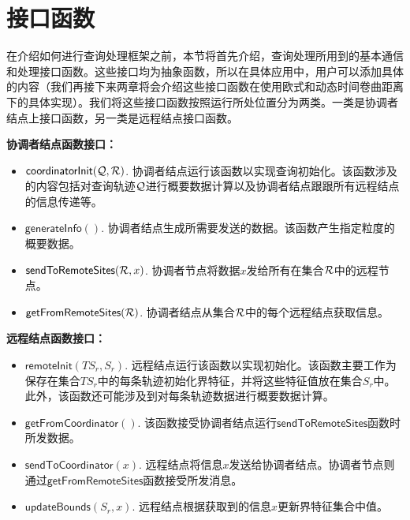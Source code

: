 \section{接口函数}\label{sec-c3-interface}
在介绍如何进行查询处理框架之前，本节将首先介绍，查询处理所用到的基本通信和处理接口函数。这些接口均为抽象函数，所以在具体应用中，用户可以添加具体的内容（我们再接下来两章将会介绍这些接口函数在使用欧式和动态时间卷曲距离下的具体实现）。我们将这些接口函数按照运行所处位置分为两类。一类是协调者结点上接口函数，另一类是远程结点接口函数。

\textbf{协调者结点函数接口：}
\begin{itemize}
	\item  $\textsf{coordinatorInit}({\cal Q}, {\cal R})$.
	协调者结点运行该函数以实现查询初始化。该函数涉及的内容包括对查询轨迹$\cal Q$进行概要数据计算以及协调者结点跟跟所有远程结点的信息传递等。
	
		\item $\textsf{generateInfo}()$. 
		协调者结点生成所需要发送的数据。该函数产生指定粒度的概要数据。
	
	
	\item  $\textsf{sendToRemoteSites}({\cal R}, x)$.
	协调者节点将数据$x$发给所有在集合$\cal R$中的远程节点。

		\item $\textsf{getFromRemoteSites}({\cal R})$.
		协调者结点从集合$\cal R$中的每个远程结点获取信息。
\end{itemize}	

\textbf{远程结点函数接口：}
\begin{itemize}
		\item $\textsf{remoteInit}(TS_{r} , S_{r})$.
		远程结点运行该函数以实现初始化。该函数主要工作为保存在集合$TS_{r}$中的每条轨迹初始化界特征，并将这些特征值放在集合$S_{r}$中。此外，该函数还可能涉及到对每条轨迹数据进行概要数据计算。
		
			\item $\textsf{getFromCoordinator}()$. 
			该函数接受协调者结点运行$\textsf{sendToRemoteSites}$函数时所发数据。
		
			\item $\textsf{sendToCoordinator}(x)$.
			远程结点将信息$x$发送给协调者结点。协调者节点则通过$\textsf{getFromRemoteSites}$函数接受所发消息。
		
			\item $\textsf{updateBounds}(S_r, x)$.
		远程结点根据获取到的信息$x$更新界特征集合中值。
\end{itemize}	

